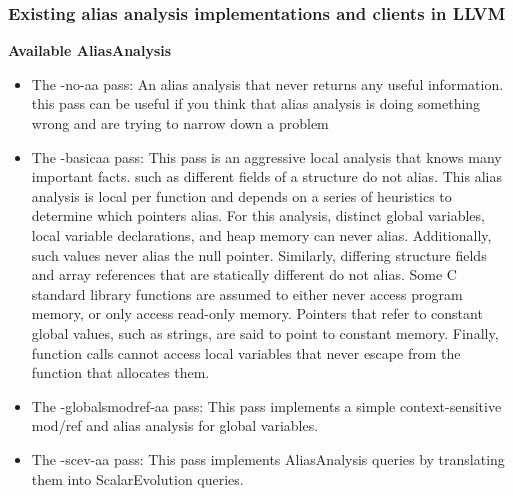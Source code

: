 \subsubsection{Existing alias analysis implementations and clients in LLVM}


\textbf{\large Available AliasAnalysis}

\begin{itemize}
 \item The -no-aa pass: An alias analysis that never returns any useful information. this pass can
 be useful if you think that alias analysis is doing something wrong and are trying to narrow
 down a problem
 \item The -basicaa pass: This pass is an aggressive local analysis that knows many important facts.
 such as different fields of a structure do not alias. This alias analysis is local per function and
 depends on a series of heuristics to determine which pointers alias. For this analysis,
 distinct global variables, local variable declarations, and heap memory can never
 alias. Additionally, such values never alias the null pointer. Similarly, differing
 structure fields and array references that are statically different do not alias. Some
 C standard library functions are assumed to either never access program memory, or
 only access read-only memory. Pointers that refer to constant global values, such as
 strings, are said to point to constant memory. Finally, function calls cannot access
 local variables that never escape from the function that allocates them.
 \item The -globalsmodref-aa pass: This pass implements a simple context-sensitive mod/ref and
 alias analysis for global variables.
 \item  The -scev-aa pass: This pass implements AliasAnalysis queries by translating them into
 ScalarEvolution queries.
    
\end{itemize}    




